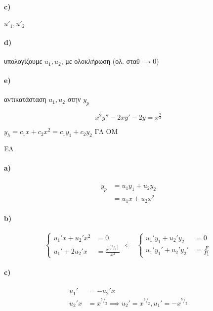 \documentclass[11pt,a4paper,titlepage,final]{article}
\begin{document}
\paragraph{\textlatin{c)}}
\(
u'_1,u'_2
\)

\paragraph{\textlatin{d)}}
υπολογίζουμε \(u_1,u_2\), με ολοκλήρωση (ολ. σταθ \(\rightarrow 0\))

\paragraph{\textlatin{e)}}
αντικατάσταση \(u_1,u_2\) στην \(y_p\)

\begin{exercise*}{6.1}
	\[
	x^2y'' -2xy' -2y = x^{\frac{9}{2}}
	\]

	\(
	y_h = c_1x+c_2x^2 = c_1y_1 + c_2y_2 \text{ ΓΛ ΟΜ}
	\)
	
		\tcblower
	ΕΛ
	\paragraph{\textlatin{a})}
	\begin{align*}
	y_p &= u_1y_1 + u_2y_2 \\
	    &= u_1x   + u_2x^2
	\end{align*}
	
	\paragraph{\textlatin{b})}\[
	\begin{cases}
	u_1'x+u_2'x^2 &=0 \\
	u_1' + 2u_2'x &= \frac{x^{\left( ^9/_2\right)}}{x^2}	
	\end{cases} \impliedby \begin{cases}
	u_1'y_1+u_2'y_2 &= 0\\
	u_1'y_1'+u_2'y_2' &= \frac{F}{P_1}
	\end{cases}
	\]
	
	\paragraph{\textlatin{c})}
	\begin{align*}
	u_1' &= -u_2' x\\
	u_2'x &= x ^ {^5/_2} \implies u_2' = x^{^3/_2}, u_1' = -x^{^5/_2}
	\end{align*}
	

\end{exercise*}
\end{document}
